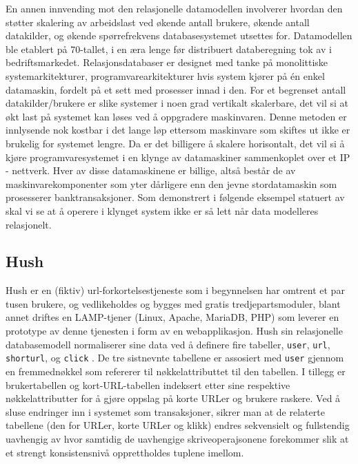 En annen innvending mot den relasjonelle datamodellen involverer hvordan den støtter skalering av arbeidslast ved økende antall brukere, økende antall datakilder, og økende spørrefrekvens databasesystemet utsettes for. Datamodellen ble etablert på 70-tallet, i en æra lenge før distribuert databeregning tok av i bedriftsmarkedet. Relasjonsdatabaser er designet med tanke på monolittiske systemarkitekturer, programvarearkitekturer hvis system kjører på én enkel datamaskin, fordelt på et sett med prosesser innad i den. For et begrenset antall datakilder/brukere er slike systemer i noen grad vertikalt skalerbare, det vil si at økt last på systemet kan løses ved å oppgradere maskinvaren. Denne metoden er innlysende nok kostbar i det lange løp ettersom maskinvare som skiftes ut ikke er brukelig for systemet lengre. Da er det billigere å skalere horisontalt, det vil si å kjøre programvaresystemet i en klynge av datamaskiner sammenkoplet over et IP - nettverk. Hver av disse datamaskinene er billige, altså består de av maskinvarekomponenter som yter dårligere enn den jevne stordatamaskin som prosesserer banktransaksjoner.  Som demonstrert i følgende eksempel statuert av \cite{george2011} skal vi se at å operere i klynget system ikke er så lett når data modelleres relasjonelt. %

\subsection{Hush}

Hush er en (fiktiv) url-forkortelsestjeneste som i begynnelsen har omtrent et par tusen brukere, og vedlikeholdes og bygges med gratis tredjepartsmoduler, blant annet driftes en LAMP-tjener (Linux, Apache, MariaDB, PHP) som leverer en prototype av denne tjenesten i form av en webapplikasjon. Hush sin relasjonelle databasemodell normaliserer sine data ved å definere fire tabeller, \texttt{user}, \texttt{url}, \texttt{shorturl}, og \texttt{click} \citep{george2011}. De tre sistnevnte tabellene er assosiert med \texttt{user} gjennom en fremmednøkkel som refererer til nøkkelattributtet til den tabellen. I tillegg er brukertabellen og kort-URL-tabellen indeksert etter sine respektive nøkkelattributter for å gjøre oppslag på korte URLer og brukere raskere. Ved å sluse endringer inn i systemet som transaksjoner, sikrer man at de relaterte tabellene (den for URLer, korte URLer og klikk) endres sekvensielt og fullstendig uavhengig av hvor samtidig de uavhengige skriveoperajsonene forekommer slik at et strengt konsistensnivå opprettholdes tuplene imellom. %

